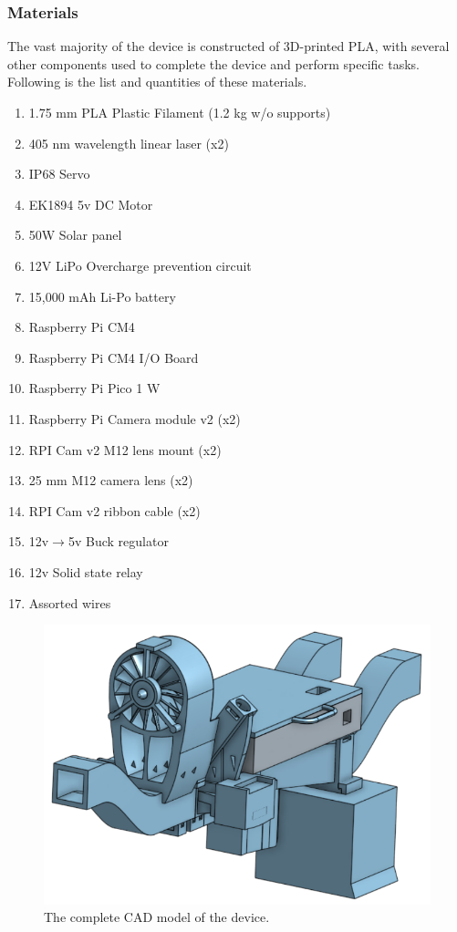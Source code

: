 \documentclass[fleqn,10pt]{SelfArx} %
\begin{document}
\begin{enumerate}
		
		
	\end{enumerate}
	\subsubsection{Materials}
		The vast majority of the device is constructed of 3D-printed PLA, with several other components used to complete the device and perform specific tasks. Following is the list and quantities of these materials.
	
	\begin{enumerate}

	\item 1.75 mm PLA Plastic Filament (1.2 kg w/o supports)
	\item 405 nm wavelength linear laser (x2)
	\item IP68 Servo
	\item EK1894 5v DC Motor
	\item 50W Solar panel
	\item 12V LiPo Overcharge prevention circuit
	\item 15,000 mAh Li-Po battery
	\item Raspberry Pi CM4
	\item Raspberry Pi CM4 I/O Board
	\item Raspberry Pi Pico 1 W
	\item Raspberry Pi Camera module v2 (x2)
	\item RPI Cam v2 M12 lens mount (x2)
	\item 25 mm M12 camera lens (x2)
	\item RPI Cam v2 ribbon cable (x2)
	\item 12v$\rightarrow$5v Buck regulator
	\item 12v Solid state relay
	\item Assorted wires
			 
	\end{enumerate}
	
	\begin{figure}[h]
		\centering
		\includegraphics[width=1\linewidth]{Figures/CADFull}
		\caption[Complete 3D Model]{The complete CAD model of the device.}
		\label{fig:FullCAD}
	\end{figure}
\end{document}
